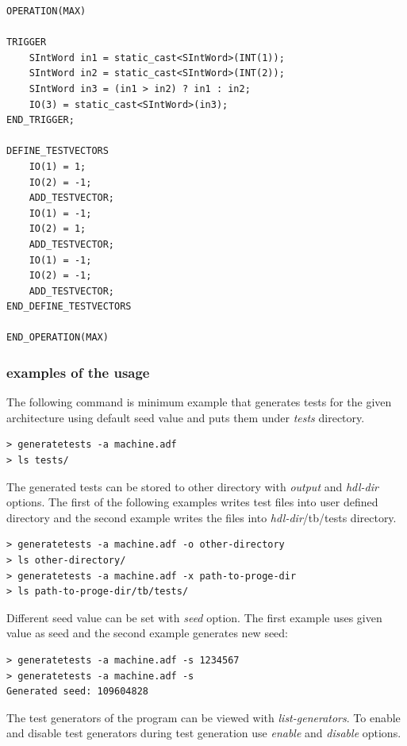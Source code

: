 \documentclass[a4paper,twoside]{tceusermanual}
\begin{document}
\begin{verbatim}
OPERATION(MAX)

TRIGGER
    SIntWord in1 = static_cast<SIntWord>(INT(1));
    SIntWord in2 = static_cast<SIntWord>(INT(2));
    SIntWord in3 = (in1 > in2) ? in1 : in2;
    IO(3) = static_cast<SIntWord>(in3);
END_TRIGGER;

DEFINE_TESTVECTORS
    IO(1) = 1;
    IO(2) = -1;
    ADD_TESTVECTOR;
    IO(1) = -1;
    IO(2) = 1;
    ADD_TESTVECTOR;
    IO(1) = -1;
    IO(2) = -1;
    ADD_TESTVECTOR;
END_DEFINE_TESTVECTORS

END_OPERATION(MAX)
\end{verbatim}

\subsubsection{examples of the usage}

The following command is minimum example that generates tests for the
given architecture using default seed value and puts them under
\emph{tests} directory.

\begin{verbatim}
> generatetests -a machine.adf
> ls tests/
\end{verbatim}

The generated tests can be stored to other directory with
\emph{output} and \emph{hdl-dir} options. The first of the following
examples writes test files into user defined directory and the second
example writes the files into \emph{hdl-dir}/tb/tests directory.

\begin{verbatim}
> generatetests -a machine.adf -o other-directory
> ls other-directory/
> generatetests -a machine.adf -x path-to-proge-dir
> ls path-to-proge-dir/tb/tests/
\end{verbatim}

Different seed value can be set with \emph{seed} option. The first
example uses given value as seed and the second example generates new
seed:

\begin{verbatim}
> generatetests -a machine.adf -s 1234567
> generatetests -a machine.adf -s
Generated seed: 109604828
\end{verbatim}

The test generators of the program can be viewed with
\emph{list-generators}. To enable and disable test generators during
test generation use \emph{enable} and \emph{disable} options.
\end{document}
